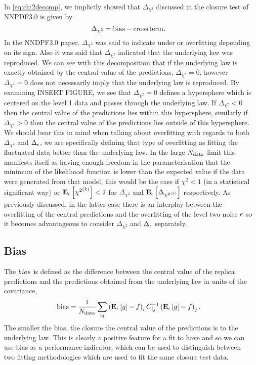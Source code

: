 In \eqref{eq:chi2decomp}, we implictly showed that $\Delta_{\chi^2}$ discussed
in the closure test of NNPDF3.0 is given by
\begin{equation}
    \Delta_{\chi^2} = {\rm bias} - {\rm cross\,term}.
\end{equation}
In the NNDPF3.0 paper, $\Delta_{\chi^2}$ was said to indicate under or overfitting
depending on its sign. Also it was said that $\Delta_{\chi^2}$ indicated that
the underlying law was reproduced. We can see with this decomposition that
if the underlying law is exactly obtained by the central value of the predictions,
$\Delta_{\chi^2}=0$, however $\Delta_{\chi^2}=0$ does not necessarily imply that
the underlying law is reproduced. By examining INSERT FIGURE, we see that
$\Delta_{\chi^2} = 0$ defines a hypersphere which is centered on the level 1 data
and passes through the underlying law. If $\Delta_{\chi^2} < 0$ then the central
value of the predictions lies within this hypersphere, similarly if
$\Delta_{\chi^2} > 0$ then the central value of the predictions lies outside
of this hypersphere. We should bear this in mind when talking about overfitting
with regards to both $\Delta_{\chi^2}$ and $\Delta_{\epsilon}$, we are specifically
defining that type of overfitting as fitting the fluctuated data better than
the underlying law. In the large $N_{\rm data}$ limit this manifests itself as
having enough freedom in the parameterisation that the minimum of the likelihood
function is lower than the expected value if the data were generated from that
model, this would be the case if $\chi^2 < 1$
(in a statistical significant way) or $\mathbf{E}_{\epsilon}\left[ {\chi^2}^{(k)} \right] < 2$ for
$\Delta_{\chi^2}$ and $\mathbf{E}_{\epsilon}\left[ \Delta_{{\chi^2}^{(k)}} \right]$ respectively. As previously discussed,
in the latter case there is an interplay between the overfitting of the central
predictions and the overfitting of the level two noise $\epsilon$ so it becomes
advantageous to consider $\Delta_{\chi^2}$ and $\Delta_{\epsilon}$ separately.

\subsection{Bias}

The {\em bias}\ is defined as the difference between the central value of the
replica predictions and the predictions obtained from the underlying law in
units of the covariance, \ie 
\begin{equation}
    \label{eq:BiasDef}
    {\rm bias} = \frac{1}{N_{\rm data}} \sum_{ij} \left( \mathbf{E}_{\epsilon}\left[ g \right] - f \right)_i C^{-1}_{ij} \left( \mathbf{E}_{\epsilon}\left[ g \right] - f \right)_j.
\end{equation}
The smaller the bias, the closure the central value of the predictions is to
the underlying law. This is clearly a positive feature for a fit to have and so
we can use bias as a performance indicator, which can be used to distinguish
between two fitting methodologies which are used to fit the same closure test
data.

